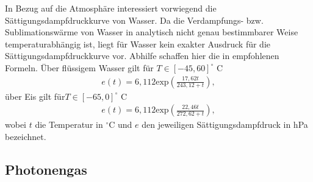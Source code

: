 \documentclass{book}
\renewcommand{\exp}{\text{exp}}
\begin{document}
In Bezug auf die Atmosphäre interessiert vorwiegend die Sättigungsdampfdruckkurve von Wasser. Da die Verdampfungs- bzw. Sublimationswärme von Wasser in analytisch nicht genau bestimmbarer Weise temperaturabhängig ist, liegt für Wasser kein exakter Ausdruck für die Sättigungsdampfdruckkurve vor. Abhilfe schaffen hier die in \cite{wmo_recommendations} empfohlenen Formeln. Über flüssigem Wasser gilt für $T\in\left[-45, 60\right]^\circ$ C
%
\begin{eqnarray}
e\left(t\right) = 6, 112\exp\left(\frac{17, 62t}{243, 12 + t}\right), 
\end{eqnarray}
%
über Eis gilt für$T\in\left[-65, 0\right]^\circ$ C
%
\begin{eqnarray}
e\left(t\right) = 6, 112\exp\left(\frac{22, 46t}{272, 62 + t}\right), 
\end{eqnarray}
%
wobei $t$ die Temperatur in $^\circ$C und $e$ den jeweiligen Sättigungsdampfdruck in hPa bezeichnet.

\subsection{Photonengas}
\label{sec:photonengas}
\end{document}
